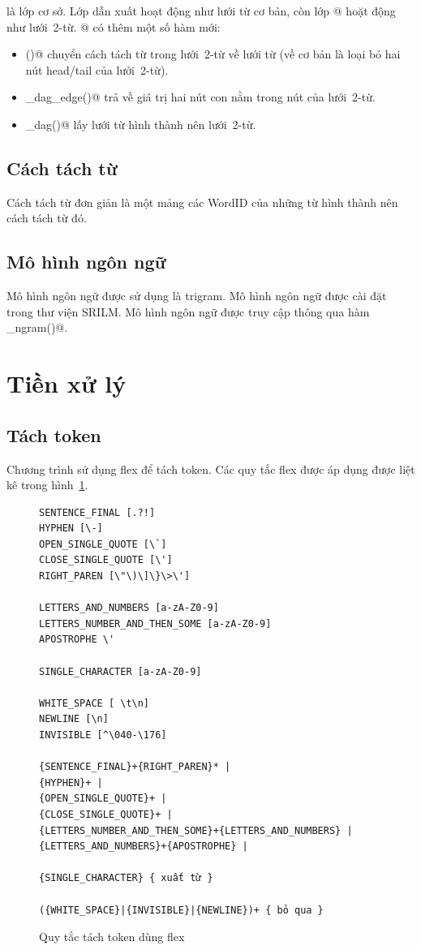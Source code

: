\documentclass[a4paper,oneside,14pt]{extbook} %
\begin{document}
\verb@DAG@ là lớp cơ sở. Lớp dẫn xuất \verb@WordDAG@ hoạt động như
lưới từ cơ bản, còn lớp @ hoặt động như lưới~2-từ.
@ có thêm một số hàm mới:
\begin{itemize}
\item \verb@demangle()@ chuyển cách tách từ trong lưới~2-từ về lưới từ
  (về cơ bản là loại bỏ hai nút head/tail của lưới~2-từ).
\item \verb@node_dag_edge()@ trả về giá trị hai nút con nằm trong nút
  của lưới~2-từ.
\item \verb@get_dag()@ lấy lưới từ hình thành nên lưới~2-từ.
\end{itemize}


\subsection{Cách tách từ}

Cách tách từ đơn giản là một mảng các WordID của những từ hình thành
nên cách tách từ đó.

\subsection{Mô hình ngôn ngữ}

Mô hình ngôn ngữ được sử dụng là trigram. Mô hình ngôn ngữ được cài
đặt trong thư viện SRILM. Mô hình ngôn ngữ được truy cập thông qua hàm
\verb@get_ngram()@. 

\section{Tiền xử lý}


\subsection{Tách token}
\label{sub:preprocess:token}

Chương trình sử dụng flex để tách token. Các quy tắc flex được áp dụng
được liệt kê trong hình~\ref{fig:flex-token}.
\begin{figure}[htbp]
  \centering
\begin{verbatim}
SENTENCE_FINAL [.?!]
HYPHEN [\-]
OPEN_SINGLE_QUOTE [\`]
CLOSE_SINGLE_QUOTE [\']
RIGHT_PAREN [\"\)\]\}\>\']

LETTERS_AND_NUMBERS [a-zA-Z0-9]
LETTERS_NUMBER_AND_THEN_SOME [a-zA-Z0-9]
APOSTROPHE \'

SINGLE_CHARACTER [a-zA-Z0-9]

WHITE_SPACE [ \t\n]
NEWLINE [\n]
INVISIBLE [^\040-\176]

{SENTENCE_FINAL}+{RIGHT_PAREN}* |
{HYPHEN}+ |
{OPEN_SINGLE_QUOTE}+ |
{CLOSE_SINGLE_QUOTE}+ |
{LETTERS_NUMBER_AND_THEN_SOME}+{LETTERS_AND_NUMBERS} |
{LETTERS_AND_NUMBERS}+{APOSTROPHE} |

{SINGLE_CHARACTER} { xuất từ }

({WHITE_SPACE}|{INVISIBLE}|{NEWLINE})+ { bỏ qua }
\end{verbatim}
  
  \caption{Quy tắc tách token dùng flex}
  \label{fig:flex-token}
\end{figure}
\end{document}

